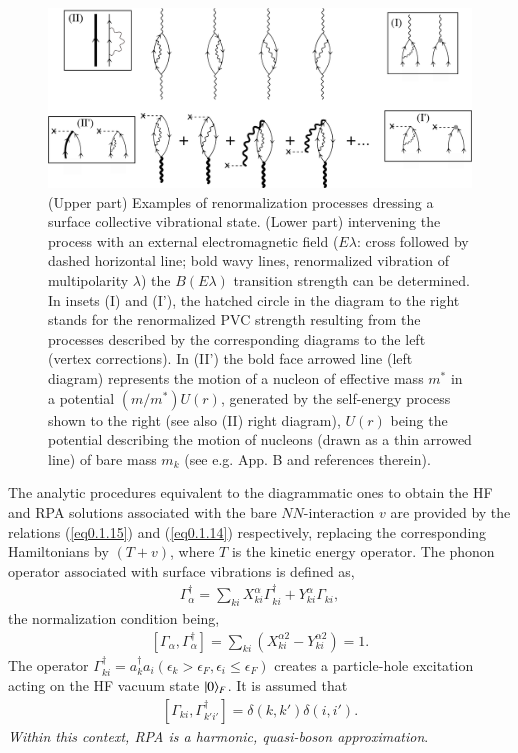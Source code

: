 \begin{figure}
	\centerline {
		\includegraphics*[width=15cm]{introduccion/figs/figpreface9}
	}
	\caption{(Upper part) Examples of renormalization processes dressing a surface collective vibrational state. (Lower part) intervening the process with an external electromagnetic field ($E\lambda$: cross followed by dashed horizontal line; bold wavy lines, renormalized vibration of multipolarity $\lambda$) the $B(E\lambda)$ transition strength can be determined. In insets (I) and (I'), the hatched circle in the diagram to the right stands for the renormalized PVC strength resulting from the processes described by the corresponding diagrams to the left (vertex corrections). In  (II') the bold face arrowed line  (left diagram) represents  the motion of a nucleon of effective mass $m^*$ in a potential $(m/m^*)U(r)$, generated by the self-energy process shown to the right (see also (II) right diagram), $U(r)$  being the potential describing the motion of nucleons (drawn as a thin  arrowed line) of bare mass $m_k$  (see e.g. \cite{Brink:05} App. B and references therein).}
	\label{fig1.0.9}
\end{figure}

The analytic procedures equivalent  to the diagrammatic ones to obtain the HF  and RPA solutions associated with the bare $NN$-interaction $v$ are provided by the relations (\ref{eq0.1.15}) and (\ref{eq0.1.14}) respectively, replacing the corresponding Hamiltonians by $(T+v)$, where $T$ is the kinetic energy operator. The phonon operator associated with surface vibrations is defined as,
\begin{align}\label{eq1.0.26}
\Gamma_\alpha^\dagger=\sum_{ki}X_{ki}^\alpha\Gamma_{ki}^\dagger+Y_{ki}^\alpha\Gamma_{ki},
\end{align}
 the normalization condition being, 
\begin{align}\label{eq1.0.27}
\left[\Gamma_\alpha,\Gamma_\alpha^\dagger\right]=\sum_{ki}\left(X_{ki}^{\alpha2}-Y_{ki}^{\alpha2}\right)=1.
\end{align}
The operator $\Gamma^\dagger_{ki}=a^\dagger_{k}a_{i} (\epsilon_k>\epsilon_F,\epsilon_i\leq\epsilon_F)$ creates a particle-hole excitation acting on the HF vacuum state $|{0} \rangle_F$. It is assumed that
\begin{align}\label{eq1.0.28}
\left[\Gamma_{ki},\Gamma_{k'i'}^\dagger\right]=\delta(k,k')\delta(i,i').
\end{align}
\textit{Within this context, RPA is a harmonic, quasi-boson approximation}.


